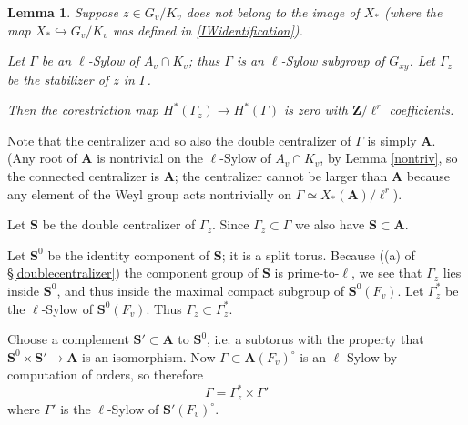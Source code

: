 \documentclass[10pt]{amsart}
\newcommand{\Z}{\mathbf{Z}}
\newtheorem{lemma}[subsection]{Lemma}
\theoremstyle{remark}
\begin{document}
 
  
 \begin{lemma} \label{splitness}  Suppose $z \in G_v/K_v$ does not belong to the image of $X_*$
 (where the map  $X_* {\hookrightarrow}  G_v/K_v$ was  defined in
\eqref{IWidentification}). 
 
 Let $\Gamma$ be an $\ell$-Sylow of $A_v \cap K_v$; 
 thus $\Gamma$ is an $\ell$-Sylow subgroup of $G_{xy}$.
 Let $\Gamma_z$ be the stabilizer of $z$ in $\Gamma$.  
 
 Then the corestriction map  $H^*(\Gamma_z) \rightarrow H^*(\Gamma)$ is zero with $\Z/\ell^r$ coefficients.
%
%
\end{lemma}



 
 
 \proof  
 
%
%
%
%
 
 Note that the centralizer  and so also the double centralizer of $\Gamma$ is simply $\mathbf{A}$. (Any root of $\mathbf{A}$ is nontrivial on the $\ell$-Sylow of $A_v \cap K_v$,  by Lemma \ref{nontriv}, so the connected centralizer is $\mathbf{A}$; 
the centralizer cannot be larger than $\mathbf{A}$ because any element of the Weyl group acts nontrivially on $\Gamma \simeq X_*(\mathbf{A})/\ell^r$). 
 

 
 
Let $\mathbf{S}$ be the double centralizer of   $\Gamma_z$. 
  Since $\Gamma_z \subset \Gamma$
we also have $\mathbf{S} \subset \mathbf{A}$. 

 Let $\mathbf{S}^0$ be the identity component of $\mathbf{S}$; it is a split torus.  Because ((a) of \S \ref{doublecentralizer}) the component group of $\mathbf{S}$ is prime-to-$\ell$, we see that 
$\Gamma_z$ lies inside $\mathbf{S}^0$, and thus inside the maximal compact subgroup of $\mathbf{S}^0(F_v)$.
Let $\Gamma_z^*$ be the $\ell$-Sylow of $\mathbf{S}^0(F_v)$. Thus $\Gamma_z \subset \Gamma_z^*$. 
%
%
%
%
  
 
Choose a complement $\mathbf{S}' \subset \mathbf{A}$ to $\mathbf{S}^0$, i.e. a subtorus  
with the property that $\mathbf{S}^0 \times \mathbf{S}' \rightarrow \mathbf{A}$ is an isomorphism.  
%
Now $\Gamma \subset \mathbf{A}(F_v)^{\circ}$ is an $\ell$-Sylow by computation of orders, so
therefore $$\Gamma = \Gamma_z^* \times \Gamma'$$
where $\Gamma'$ is the $\ell$-Sylow of $\mathbf{S}'(F_v)^{\circ}$. 
\end{document}
